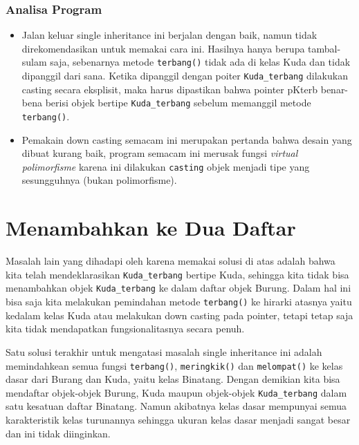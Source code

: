 \subsubsection*{Analisa Program}

\begin{itemize}

\item
  Jalan keluar single inheritance ini berjalan dengan baik, namun tidak
  direkomendasikan untuk memakai cara ini. Hasilnya hanya berupa
  tambal-sulam saja, sebenarnya metode \texttt{terbang()} tidak ada di
  kelas Kuda dan tidak dipanggil dari sana. Ketika dipanggil dengan
  poiter \texttt{Kuda\_terbang} dilakukan casting secara eksplisit, maka
  harus dipastikan bahwa pointer pKterb benar-bena berisi objek bertipe
  \texttt{Kuda\_terbang} sebelum memanggil metode \texttt{terbang()}.
\item
  Pemakain down casting semacam ini merupakan pertanda bahwa desain yang
  dibuat kurang baik, program semacam ini merusak fungsi \emph{virtual
  polimorfisme} karena ini dilakukan \texttt{casting} objek menjadi tipe
  yang sesungguhnya (bukan polimorfisme).
\end{itemize}

\section{Menambahkan ke Dua Daftar}\label{menambahkan-ke-dua-daftar}

Masalah lain yang dihadapi oleh karena memakai solusi di atas adalah
bahwa kita telah mendeklarasikan \texttt{Kuda\_terbang} bertipe Kuda,
sehingga kita tidak bisa menambahkan objek \texttt{Kuda\_terbang} ke
dalam daftar objek Burung. Dalam hal ini bisa saja kita melakukan
pemindahan metode \texttt{terbang()} ke hirarki atasnya yaitu kedalam
kelas Kuda atau melakukan down casting pada pointer, tetapi tetap saja
kita tidak mendapatkan fungsionalitasnya secara penuh.

Satu solusi terakhir untuk mengatasi masalah single inheritance ini
adalah memindahkean semua fungsi \texttt{terbang()},
\texttt{meringkik()} dan \texttt{melompat()} ke kelas dasar dari Burang
dan Kuda, yaitu kelas Binatang. Dengan demikian kita bisa mendaftar
objek-objek Burung, Kuda maupun objek-objek \texttt{Kuda\_terbang} dalam
satu kesatuan daftar Binatang. Namun akibatnya kelas dasar mempunyai
semua karakteristik kelas turunannya sehingga ukuran kelas dasar menjadi
sangat besar dan ini tidak diinginkan.

